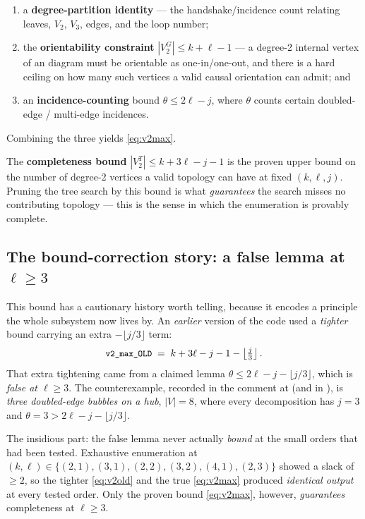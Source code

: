 \begin{enumerate}
  \item a \textbf{degree-partition identity} --- the handshake/incidence count
        relating leaves, $V_2$, $V_3$, edges, and the loop number;
  \item the \textbf{orientability constraint} $|V_2^{G}| \le k + \ell - 1$ --- a
        degree-2 internal vertex of an \msrjd{} diagram must be orientable as
        one-in/one-out, and there is a hard ceiling on how many such vertices a
        valid causal orientation can admit; and
  \item an \textbf{incidence-counting} bound $\theta \le 2\ell - j$, where
        $\theta$ counts certain doubled-edge / multi-edge incidences.
\end{enumerate}
Combining the three yields \eqref{eq:v2max}.

\begin{defn}
The \textbf{completeness bound} $|V_2^{T}| \le k+3\ell-j-1$ is the proven upper
bound on the number of degree-2 vertices a valid topology can have at fixed
$(k,\ell,j)$. Pruning the tree search by this bound is what \emph{guarantees}
the search misses no contributing topology --- this is the sense in which the
enumeration is provably complete.
\end{defn}

\subsection{The bound-correction story: a false lemma at \texorpdfstring{$\ell\ge 3$}{l>=3}}

This bound has a cautionary history worth telling, because it encodes a principle
the whole subsystem now lives by. An \emph{earlier} version of the code used a
\emph{tighter} bound carrying an extra $-\lfloor j/3\rfloor$ term:
\begin{equation}
  \texttt{\small v2\_max\_OLD} \;=\; k + 3\ell - j - 1 - \left\lfloor \tfrac{j}{3}
  \right\rfloor .
  \label{eq:v2old}
\end{equation}
That extra tightening came from a claimed lemma $\theta \le 2\ell - j -
\lfloor j/3\rfloor$, which is \emph{false at $\ell\ge 3$}. The counterexample,
recorded in the comment at  (and in
), is \emph{three doubled-edge bubbles on a hub},
$|V|=8$, where every decomposition has $j=3$ and $\theta = 3 > 2\ell - j -
\lfloor j/3\rfloor$.

The insidious part: the false lemma never actually \emph{bound} at the small
orders that had been tested. Exhaustive enumeration at $(k,\ell)\in\{(2,1),(3,1),
(2,2),(3,2),(4,1),(2,3)\}$ showed a slack of $\ge 2$, so the tighter
\eqref{eq:v2old} and the true \eqref{eq:v2max} produced \emph{identical output} at
every tested order. Only the proven bound \eqref{eq:v2max}, however,
\emph{guarantees} completeness at $\ell\ge 3$.

